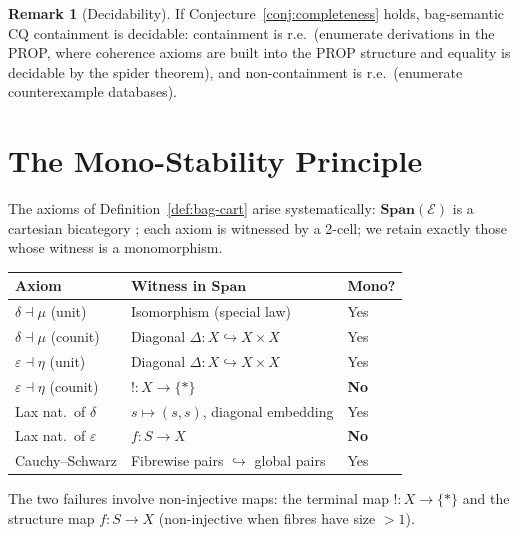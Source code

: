 \documentclass[11pt,a4paper]{article}
\theoremstyle{definition}
\newtheorem{remark}[theorem]{Remark}
\newcommand{\Span}{\mathbf{Span}}
\begin{document}
\begin{remark}[Decidability]
If Conjecture~\ref{conj:completeness} holds, bag-semantic CQ containment is decidable: containment is r.e.\ (enumerate derivations in the PROP, where coherence axioms are built into the PROP structure and equality is decidable by the spider theorem), and non-containment is r.e.\ (enumerate counterexample databases).
\end{remark}

\section{The Mono-Stability Principle}
\label{sec:mono-stability}

The axioms of Definition~\ref{def:bag-cart} arise systematically: $\Span(\mathcal{E})$ is a cartesian bicategory \cite{CKWW}; each axiom is witnessed by a 2-cell; we retain exactly those whose witness is a monomorphism.

\medskip
\begin{center}
\begin{tabular}{lll}
\hline
\textbf{Axiom} & \textbf{Witness in $\Span$} & \textbf{Mono?} \\
\hline
$\delta \dashv \mu$ (unit) & Isomorphism (special law) & Yes \\
$\delta \dashv \mu$ (counit) & Diagonal $\Delta \colon X \hookrightarrow X \times X$ & Yes \\
$\varepsilon \dashv \eta$ (unit) & Diagonal $\Delta \colon X \hookrightarrow X \times X$ & Yes \\
$\varepsilon \dashv \eta$ (counit) & $! \colon X \to \{*\}$ & \textbf{No} \\
Lax nat.\ of $\delta$ & $s \mapsto (s,s)$, diagonal embedding & Yes \\
Lax nat.\ of $\varepsilon$ & $f \colon S \to X$ & \textbf{No} \\
Cauchy--Schwarz & Fibrewise pairs $\hookrightarrow$ global pairs & Yes \\
\hline
\end{tabular}
\end{center}

\medskip\noindent The two failures involve non-injective maps: the terminal map $! \colon X \to \{*\}$ and the structure map $f \colon S \to X$ (non-injective when fibres have size $> 1$).

\end{document}
